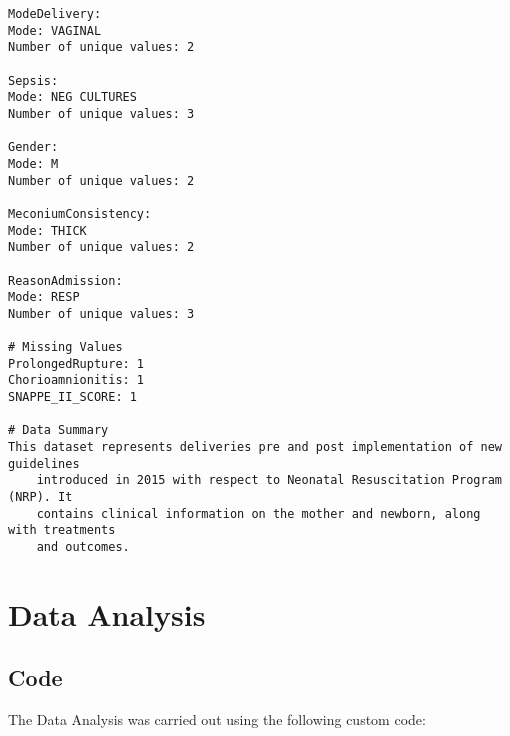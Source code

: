 \documentclass[11pt]{article}
\begin{document}
\begin{Verbatim}[tabsize=4]
ModeDelivery:
Mode: VAGINAL
Number of unique values: 2

Sepsis:
Mode: NEG CULTURES
Number of unique values: 3

Gender:
Mode: M
Number of unique values: 2

MeconiumConsistency:
Mode: THICK
Number of unique values: 2

ReasonAdmission:
Mode: RESP
Number of unique values: 3

# Missing Values
ProlongedRupture: 1
Chorioamnionitis: 1
SNAPPE_II_SCORE: 1

# Data Summary
This dataset represents deliveries pre and post implementation of new guidelines
	introduced in 2015 with respect to Neonatal Resuscitation Program (NRP). It
	contains clinical information on the mother and newborn, along with treatments
	and outcomes.
\end{Verbatim}

\section{Data Analysis} \subsection{Code}The Data Analysis was carried out using the following custom code:
\end{document}
